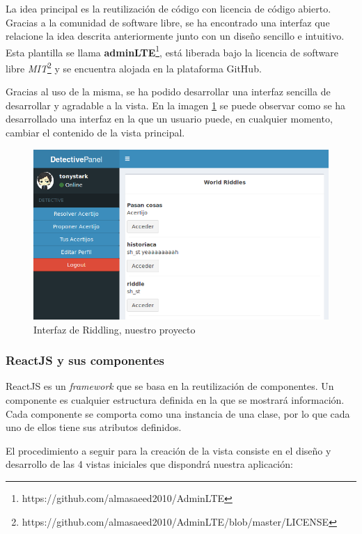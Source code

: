 La idea principal es la reutilización de código con licencia de código abierto. Gracias a la comunidad de software libre, se ha encontrado una interfaz que relacione la idea descrita anteriormente junto con un diseño sencillo e intuitivo. Esta plantilla se llama \textbf{adminLTE}\footnote{https://github.com/almasaeed2010/AdminLTE}, está liberada bajo la licencia de software libre \textit{MIT}\footnote{https://github.com/almasaeed2010/AdminLTE/blob/master/LICENSE} y se encuentra alojada en la plataforma GitHub.

Gracias al uso de la misma, se ha podido desarrollar una interfaz sencilla de desarrollar y agradable a la vista. En la imagen \ref{fig::rid} se puede observar como se ha desarrollado una interfaz en la que un usuario puede, en cualquier momento, cambiar el contenido de la vista principal.

\begin{figure}[htbp]
    \centerline{\includegraphics[width=12cm]{figuras/riddling.png}}
    \caption{Interfaz de Riddling, nuestro proyecto}
    \label{fig::rid}
\end{figure}

\subsubsection{ReactJS y sus componentes}

ReactJS es un \textit{framework} que se basa en la reutilización de componentes. Un componente es cualquier estructura definida en la que se mostrará información. Cada componente se comporta como una instancia de una clase, por lo que cada uno de ellos tiene sus atributos definidos.

El procedimiento a seguir para la creación de la vista consiste en el diseño y desarrollo de las 4 vistas iniciales que dispondrá nuestra aplicación:

